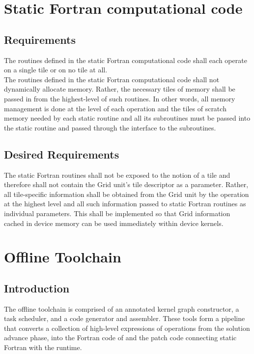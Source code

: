 \documentclass{article}
\begin{document}
\section{Static Fortran computational code}
\subsection{Requirements}
The routines defined in the static Fortran computational code shall each operate
on a single tile or on no tile at all.\\

The routines defined in the static Fortran computational code shall not
dynamically allocate memory.  Rather, the necessary tiles of memory shall be
passed in from the highest-level of such routines.  In other words, all memory
management is done at the level of each operation and the tiles of scratch
memory needed by each static routine and all its subroutines must be passed into
the static routine and passed through the interface to the subroutines.

\subsection{Desired Requirements}
The static Fortran routines shall not be exposed to the notion of a tile and
therefore shall not contain the Grid unit's tile descriptor as a parameter.
Rather, all tile-specific information shall be obtained from the Grid unit by
the operation at the highest level and all such information passed to static
Fortran routines as individual parameters.  This shall be implemented so that
Grid information cached in device memory can be used immediately within device
kernels.

\section{Offline Toolchain}

\subsection{Introduction}

The offline toolchain is comprised
of an annotated kernel graph constructor, a task scheduler, and a code
generator and assembler.  These tools %
form a pipeline that converts a collection of high-level expressions of
operations from the solution advance phase, into the Fortran
code of
 and the patch code
connecting static Fortran with
the runtime.\\
\end{document}
